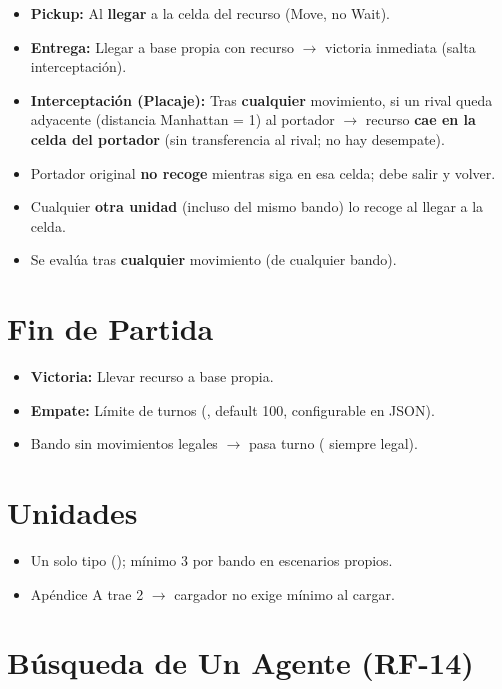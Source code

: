 \begin{itemize}
\item \textbf{Pickup:} Al \textbf{llegar} a la celda del recurso (Move, no Wait).
\item \textbf{Entrega:} Llegar a base propia con recurso $\to$ victoria inmediata (salta interceptación).
\item \textbf{Interceptación (Placaje):} Tras \textbf{cualquier} movimiento, si un rival queda adyacente
  (distancia Manhattan = 1) al portador $\to$ recurso \textbf{cae en la celda del portador}
  (sin transferencia al rival; no hay desempate).
\item Portador original \textbf{no recoge} mientras siga en esa celda; debe salir y volver.
\item Cualquier \textbf{otra unidad} (incluso del mismo bando) lo recoge al llegar a la celda.
\item Se evalúa tras \textbf{cualquier} movimiento (de cualquier bando).
\end{itemize}

\section{Fin de Partida}
\label{sec:fin-partida}

\begin{itemize}
\item \textbf{Victoria:} Llevar recurso a base propia.
\item \textbf{Empate:} Límite de turnos (, default 100, configurable en JSON).
\item Bando sin movimientos legales $\to$ pasa turno ( siempre legal).
\end{itemize}

\section{Unidades}
\label{sec:unidades}

\begin{itemize}
\item Un solo tipo (); mínimo 3 por bando en escenarios propios.
\item Apéndice A trae 2 $\to$ cargador no exige mínimo al cargar.
\end{itemize}

\section{Búsqueda de Un Agente (RF-14)}
\label{sec:busqueda-unagente}

